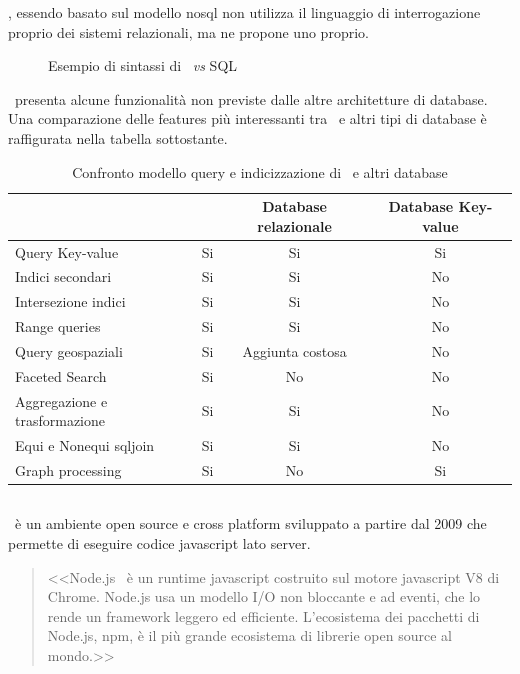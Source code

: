 \mongodb, essendo basato sul modello \acrshort{nosql} non utilizza il linguaggio di interrogazione proprio dei sistemi relazionali, ma ne propone uno proprio.
\begin{figure}[!h] 
	\centering    

	\caption[Esempio di sintassi di \mongodb]{Esempio di sintassi di \mongodb~\textit{vs} SQL}
	\label{fig:mongodb-syntax-example}
\end{figure}
\mongodb~presenta alcune funzionalità non previste dalle altre architetture di database. Una comparazione delle features più interessanti tra \mongodb~e altri tipi di database è raffigurata nella tabella sottostante.
\begin{table}[!h]
	\caption{Confronto modello query e indicizzazione di \mongodb~e altri database\cite{mongodbarchitecture}}
	\centering
	\label{table:mongodbquerymodel}
	\begin{tabular}{c c c c}
		  & \mongodb & Database relazionale  & Database Key-value\\ 
		\midrule
		\multicolumn{1}{l}{Query Key-value} & Si & Si  & Si   \\
		\multicolumn{1}{l}{Indici secondari} & Si & Si  & No   \\
		\multicolumn{1}{l}{Intersezione indici} & Si & Si  & No   \\
		\multicolumn{1}{l}{Range queries} & Si & Si  & No   \\
		\multicolumn{1}{l}{Query geospaziali} & Si & Aggiunta costosa  & No   \\
		\multicolumn{1}{l}{Faceted Search} & Si & No  & No   \\
		\multicolumn{1}{l}{Aggregazione e trasformazione} & Si & Si  & No   \\
		\multicolumn{1}{l}{Equi e Nonequi \gls{sqljoin}} & Si & Si  & No   \\
		\multicolumn{1}{l}{Graph processing} & Si & No  & Si   \\
		\bottomrule
	\end{tabular}
\end{table}

\subsection{\nodejs}
\nodejs~è un ambiente open source e cross platform sviluppato a partire dal 2009 che permette di eseguire codice \gls{javascript} lato server.
\begin{quote}
	<<Node.js\textregistered ~ è un runtime \gls{javascript} costruito sul motore \gls{javascript} V8 di Chrome. Node.js usa un modello I/O non bloccante e ad eventi, che lo rende un framework leggero ed efficiente. L'ecosistema dei pacchetti di Node.js, npm, è il più grande ecosistema di librerie open source al mondo.>> \cite{nodejs}
\end{quote}

